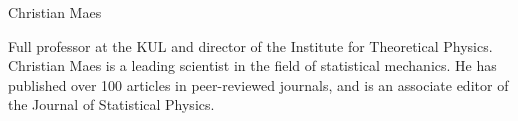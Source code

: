 \begin{participant}[type=PI,PM=12,gender=male,salary=5500]{Christian Maes}

Full professor at the KUL and director of the Institute for Theoretical Physics.
%
Christian Maes is a leading scientist in the field of statistical mechanics. He has
published over 100 articles in peer-reviewed journals, and is an associate editor of the
Journal of Statistical Physics.

\end{participant}

